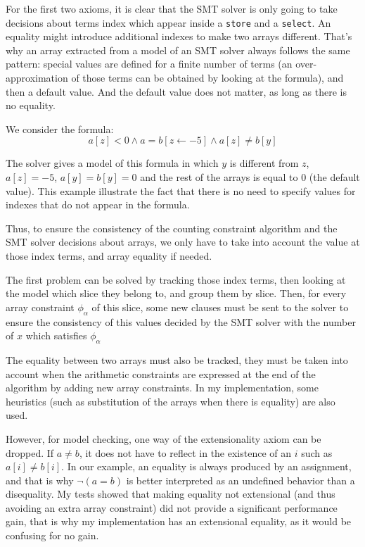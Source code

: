For the first two axioms, it is clear that the SMT solver is only going
to take decisions about terms index which appear inside a \texttt{store}
and a \texttt{select}. An equality might introduce additional indexes to
make two arrays different. That's why an array extracted from a model of
an SMT solver always follows the same pattern: special values are
defined for a finite number of terms (an over-approximation of those
terms can be obtained by looking at the formula), and then a default
value. And the default value does not matter, as long as there is no
equality.

\begin{example}
We consider the formula:
\begin{equation*}
a[z] < 0 \land a = b[z \leftarrow -5] \land a[z] \neq b[y]
\end{equation*}

The solver \solver gives a model of this formula in which $y$ is different from
$z$, $a[z] = -5$, $a[y] = b[y] = 0$ and the rest of the arrays is equal to $0$
(the default value). This example illustrate the fact that there is no need to
specify values for indexes that do not appear in the formula.
\end{example}


Thus, to ensure the consistency of the counting constraint algorithm and
the SMT solver decisions about arrays, we only have to take into account
the value at those index terms, and array equality if needed.

The first problem can be solved by tracking those index terms, then
looking at the model which slice they belong to, and group them by
slice. Then, for every array constraint $\phi_\alpha$ of this slice,
some new clauses must be sent to the solver to ensure the consistency of
this values decided by the SMT solver with the number of $x$ which
satisfies $\phi_\alpha$

The equality between two arrays must also be tracked, they must be taken
into account when the arithmetic constraints are expressed at the end of
the algorithm by adding new array constraints. In my implementation, some heuristics (such as
substitution of the arrays when there is equality) are also used.

However, for model checking, one way of the extensionality axiom can be dropped. If $a \neq b$, it
does not have to reflect in the existence of an $i$ such as $a[i] \neq b[i]$. In our example, an
equality is always produced by an assignment, and that is why $\lnot (a = b)$ is better interpreted
as an undefined behavior than a disequality. My tests showed that making equality not extensional
(and thus avoiding an extra array constraint) did not provide a significant performance gain, that
is why my implementation has an extensional equality, as it would be confusing for no gain.


